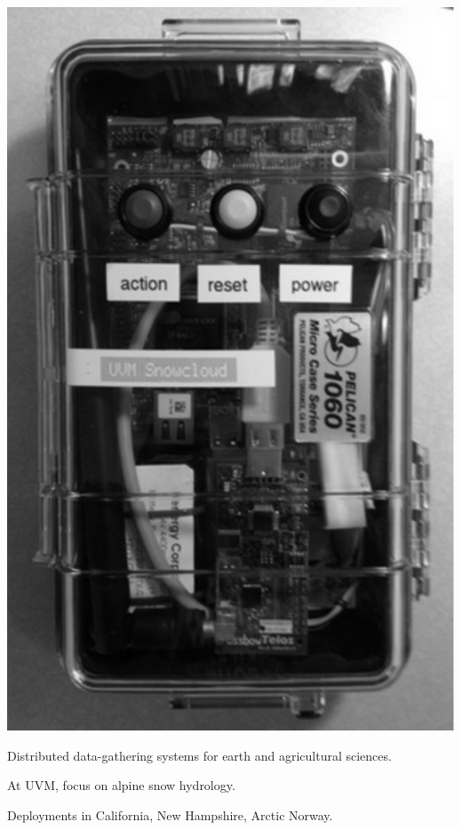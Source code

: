 \begin{center}
\includegraphics[scale=.50]{harvester} 
\end{center}

\begin{citemize}
\item Distributed data-gathering systems for earth and agricultural sciences.
\item At UVM, focus on alpine snow hydrology.
\begin{citemize}
\item Deployments in California, New Hampshire, Arctic Norway.
\end{citemize}
\end{citemize}
\stopslide

